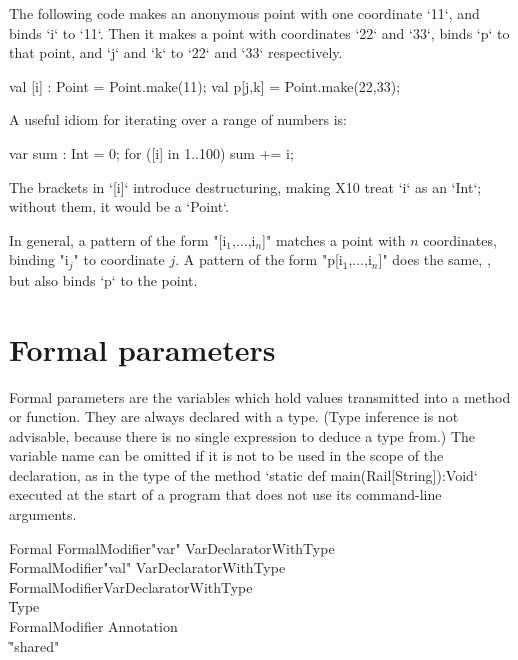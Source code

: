 The following code makes an anonymous point with one coordinate \xcd`11`, and
binds \xcd`i` to \xcd`11`.  Then it makes a point with coordinates \xcd`22`
and \xcd`33`, binds \xcd`p` to that point, and \xcd`j` and \xcd`k` to \xcd`22`
and \xcd`33` respectively.
\begin{xten}
val [i] : Point = Point.make(11);
val p[j,k] = Point.make(22,33);
\end{xten}

A useful idiom for iterating over a range of numbers is: 
\begin{xten}
var sum : Int = 0;
for ([i] in 1..100) sum += i;
\end{xten}
\noindent
The brackets in \xcd`[i]` introduce destructuring, making X10 treat \xcd`i`
as an \xcd`Int`; without them, it would be a \xcd`Point`.  

In general, a pattern of the form \xcdmath"[i$_1$,$\ldots$,i$_n$]" matches a
point with {$n$} coordinates, binding \xcdmath"i$_j$" to coordinate {$j$}.  
A pattern of the form \xcdmath"p[i$_1$,$\ldots$,i$_n$]" does the same, , but
also binds \xcd`p` to the point.

\section{Formal parameters}

Formal parameters are the variables which hold values transmitted into a
method or function.  
They are always declared with a type.  (Type inference is not
advisable, because there is no single expression to deduce a type from.)
The variable name can be omitted if it is not to be used in the
scope of the declaration, as in the type of the method 
\xcd`static def main(Rail[String]):Void` executed at the start of a program that
does not use its command-line arguments.

\begin{grammar}
Formal
        \: FormalModifier\star \xcd"var" VarDeclaratorWithType \\
        \| FormalModifier\star \xcd"val" VarDeclaratorWithType \\
        \| FormalModifier\star VarDeclaratorWithType \\
        \| Type \\
FormalModifier \: Annotation \\
              \| \xcd"shared" \\
\end{grammar}

